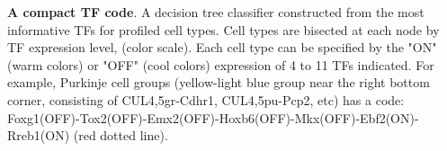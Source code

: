 \textbf{A compact TF code}. A decision tree classifier constructed from the most informative TFs for profiled cell types. Cell types are bisected at each node by TF expression level, (color scale). Each cell type can be specified by the "ON" (warm colors) or "OFF" (cool colors) expression of 4 to 11 TFs indicated. For example, Purkinje cell groups (yellow-light blue group near the right bottom corner, consisting of CUL4,5gr-Cdhr1, CUL4,5pu-Pcp2, etc) has a code: Foxg1(OFF)-Tox2(OFF)-Emx2(OFF)-Hoxb6(OFF)-Mkx(OFF)-Ebf2(ON)-Rreb1(ON) (red dotted line). 


